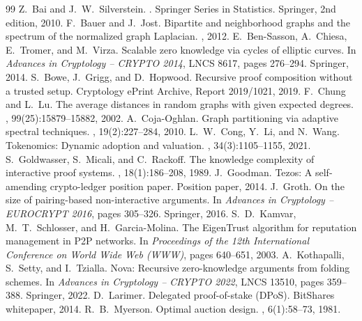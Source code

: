 \documentclass[11pt,a4paper]{article}
\numberwithin{equation}{section}
\numberwithin{table}{section}
\begin{document}
\begin{thebibliography}{99}
 Z.~Bai and J.~W.~Silverstein. . \newblock Springer Series in Statistics. Springer, 2nd edition, 2010.
 F.~Bauer and J.~Jost. \newblock Bipartite and neighborhood graphs and the spectrum of the normalized graph Laplacian. , 2012.
 E.~Ben-Sasson, A.~Chiesa, E.~Tromer, and M.~Virza. \newblock Scalable zero knowledge via cycles of elliptic curves. \newblock In {\em Advances in Cryptology -- CRYPTO 2014}, LNCS 8617, pages 276--294. Springer, 2014.
 S.~Bowe, J.~Grigg, and D.~Hopwood. \newblock Recursive proof composition without a trusted setup. \newblock Cryptology ePrint Archive, Report 2019/1021, 2019.
 F.~Chung and L.~Lu. \newblock The average distances in random graphs with given expected degrees. , 99(25):15879--15882, 2002.
 A.~Coja-Oghlan. \newblock Graph partitioning via adaptive spectral techniques. , 19(2):227--284, 2010.
 L.~W.~Cong, Y.~Li, and N.~Wang. \newblock Tokenomics: Dynamic adoption and valuation. , 34(3):1105--1155, 2021.
 S.~Goldwasser, S.~Micali, and C.~Rackoff. \newblock The knowledge complexity of interactive proof systems. , 18(1):186--208, 1989.
 J.~Goodman. \newblock Tezos: A self-amending crypto-ledger position paper. \newblock Position paper, 2014.
 J.~Groth. \newblock On the size of pairing-based non-interactive arguments. \newblock In {\em Advances in Cryptology -- EUROCRYPT 2016}, pages 305--326. Springer, 2016.
 S.~D.~Kamvar, M.~T.~Schlosser, and H.~Garcia-Molina. \newblock The EigenTrust algorithm for reputation management in P2P networks. \newblock In {\em Proceedings of the 12th International Conference on World Wide Web (WWW)}, pages 640--651, 2003.
 A.~Kothapalli, S.~Setty, and I.~Tzialla. \newblock Nova: Recursive zero-knowledge arguments from folding schemes. \newblock In {\em Advances in Cryptology -- CRYPTO 2022}, LNCS 13510, pages 359--388. Springer, 2022.
 D.~Larimer. \newblock Delegated proof-of-stake (DPoS). \newblock BitShares whitepaper, 2014.
 R.~B.~Myerson. \newblock Optimal auction design. , 6(1):58--73, 1981.

\end{thebibliography}
\end{document}
